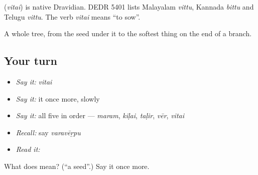 \begin{cousinweb}
\textbf{} (\emph{vitai}) is native Dravidian. DEDR 5401 lists Malayalam \emph{vittu}, Kannada \emph{bittu} and Telugu \emph{vittu}. The verb \emph{vitai} means \textquotedblleft{}to sow\textquotedblright{}.
\end{cousinweb}

\begin{grammarlens}[title={What you've built}]
A whole tree, from the seed under it to the softest thing on the end of a branch.
\end{grammarlens}

\subsection*{Your turn}
\begin{itemize}
\raggedright
  \item \emph{Say it:} \emph{vitai}
  \item \emph{Say it:} it once more, slowly
  \item \emph{Say it:} all five in order — \emph{maram}, \emph{kiḷai}, \emph{taḷir}, \emph{vēr}, \emph{vitai}
  \item \emph{Recall:} say \emph{varavēṟpu}
  \item \emph{Read it:} \textbf{}
\end{itemize}

\begin{tcolorbox}[breakable,colback=teal!4,colframe=teal!35!black,title={Before you move on}]
What does  mean? (\textquotedblleft{}a seed\textquotedblright{}.) Say it once more.
\end{tcolorbox}
